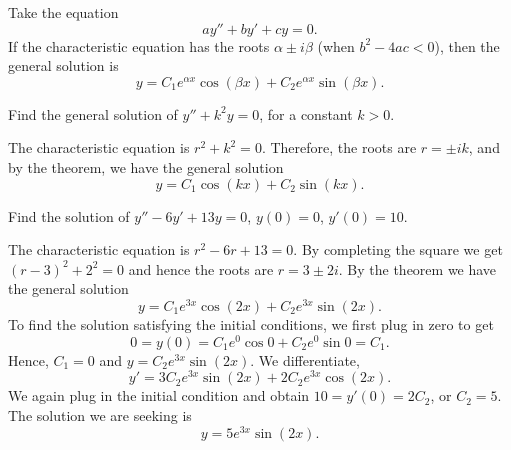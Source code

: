 \begin{theorem1}{}
Take the equation
\begin{equation*}
ay'' + by' + cy = 0 .
\end{equation*}
If the characteristic equation has the roots $\alpha \pm i \beta$
(when $b^2 - 4ac < 0$),
then the general solution is
\begin{equation*}
y = C_1 e^{\alpha x} \cos (\beta x) + C_2 e^{\alpha x} \sin (\beta x) .
\end{equation*}
\end{theorem1}

\begin{example} \label{example:sincossecondorder}
Find the general solution of $y'' + k^2 y = 0$, for a constant
$k > 0$.
\end{example}

\begin{exampleSol}
The characteristic equation is $r^2 + k^2 = 0$.  Therefore,
the roots are $r = \pm ik$, and by the theorem, we have the general solution
\begin{equation*}
y = C_1 \cos (kx) + C_2 \sin (kx) .
\end{equation*}
\end{exampleSol}

\begin{example}
Find the solution of $y'' - 6 y' + 13 y = 0$, $y(0) = 0$, $y'(0) =
10$.
\end{example}

\begin{exampleSol}
The characteristic equation is $r^2 - 6 r + 13 = 0$.  By completing the
square we get ${(r-3)}^2 + 2^2 = 0$ and hence the roots are
$r = 3 \pm 2i$.
By the theorem we have the general solution
\begin{equation*}
y = C_1 e^{3x} \cos (2x) + C_2 e^{3x} \sin (2x) .
\end{equation*}
To find the solution satisfying the initial conditions, we first plug in zero
to get
\begin{equation*}
0 = y(0) = C_1 e^{0} \cos 0 + C_2 e^{0} \sin 0  = C_1 .
\end{equation*}
Hence, $C_1 = 0$ and $y = C_2 e^{3x} \sin (2x)$.  We differentiate,
\begin{equation*}
y' = 3C_2 e^{3x} \sin (2x) + 2C_2 e^{3x} \cos (2x) .
\end{equation*}
We again plug in the initial condition and obtain $10 = y'(0) = 2C_2$, or
$C_2 = 5$.  The solution we are seeking is
\begin{equation*}
y = 5 e^{3x} \sin (2x) .
\end{equation*}
\end{exampleSol}

